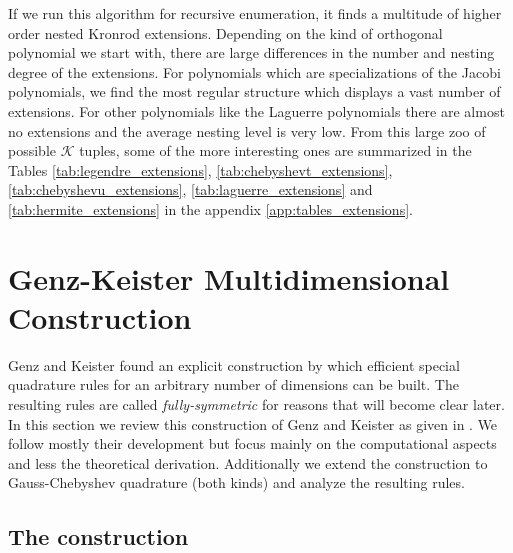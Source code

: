 \documentclass[a4paper,10pt]{article}
\begin{document}
If we run this algorithm for recursive enumeration, it finds a multitude
of higher order nested Kronrod extensions. Depending on the kind of orthogonal
polynomial we start with, there are large differences in the number and nesting
degree of the extensions. For polynomials which are specializations of the
Jacobi polynomials, we find the most regular structure which displays a vast number
of extensions. For other polynomials like the Laguerre polynomials there are almost
no extensions and the average nesting level is very low. From this large zoo of
possible $\mathcal{K}$ tuples, some of the more interesting ones are summarized
in the Tables \ref{tab:legendre_extensions}, \ref{tab:chebyshevt_extensions},
\ref{tab:chebyshevu_extensions}, \ref{tab:laguerre_extensions} and \ref{tab:hermite_extensions}
in the appendix \ref{app:tables_extensions}.


\FloatBarrier
\section{Genz-Keister Multidimensional Construction}


Genz and Keister found an explicit construction by which efficient
special quadrature rules for an arbitrary number
of dimensions can be built. The resulting rules are
called \emph{fully-symmetric} for reasons that will become
clear later. In this section we review this construction of Genz
and Keister as given in \cite{genz, genz_keister}. We follow mostly their
development but focus mainly on the computational aspects and less
the theoretical derivation. Additionally we extend the construction
to Gauss-Chebyshev quadrature (both kinds) and analyze the resulting rules.


\subsection{The construction}
\end{document}
